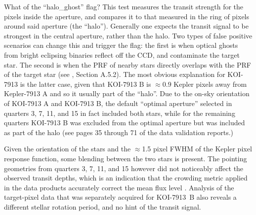 \documentclass[12pt,twocolumn]{aastex63}
\begin{document}
What of the ``halo\_ghost'' flag?  This test measures the transit
strength for the pixels inside the aperture, and compares it to that
measured in the ring of pixels around said aperture (the ``halo'').
Generally one expects the transit signal to be strongest in the
central aperture, rather than the halo.  Two types of false positive
scenarios can change this and trigger the flag: the first is when
optical ghosts from bright eclipsing binaries reflect off the CCD, and
contaminate the target star.  The second is when the PRF of nearby
stars directly overlaps with the PRF of the target star (see
\citealt{thompson_planetary_2018}, Section A.5.2).  The most obvious
explanation for KOI-7913 is the latter case, given that KOI-7913 B is
$\approx0.9$ Kepler pixels away from Kepler-7913 A and so it usually
part of the ``halo''.  Due to the on-sky orientation of KOI-7913 A and
KOI-7913 B, the default ``optimal aperture'' selected in quarters 3,
7, 11, and 15 in fact included both stars, while for the remaining
quarters KOI-7913 B was excluded from the optimal aperture but was
included as part of the halo (see pages 35 through 71 of the data
validation reports.)  

Given the orientation of the stars and the $\approx$1.5 pixel FWHM of
the Kepler pixel response function, some blending between the two
stars is present.  The pointing geometries from quarters 3, 7, 11, and
15 however did not noticeably affect the observed transit depths,
which is an indication that the crowding metric applied in the data
products accurately correct the mean flux level
\citep{2017ksci.rept....6M}.  Analysis of the target-pixel data that
was separately acquired for KOI-7913~B also reveals a
different stellar rotation period, and no hint of the transit signal.





\end{document}
